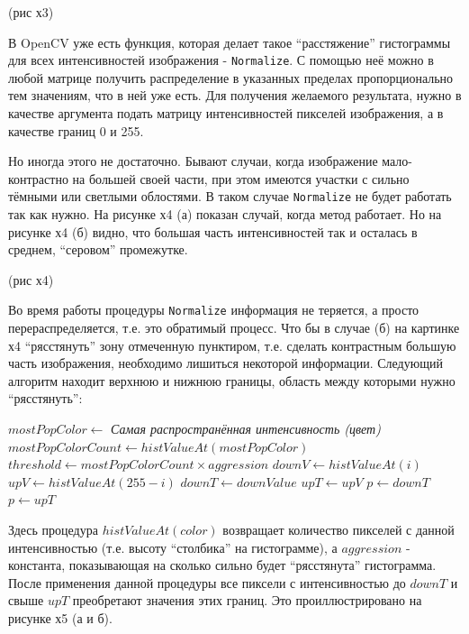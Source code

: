 \documentclass[12pt]{report}
\begin{document}
(рис х3)

В OpenCV уже есть функция, которая делает такое ``расстяжение'' гистограммы для всех интенсивностей изображения - \texttt{Normalize}. С помощью неё можно в любой матрице получить распределение в указанных пределах пропорционально тем значениям, что в ней уже есть. Для получения желаемого результата, нужно в качестве аргумента подать матрицу интенсивностей пикселей изображения, а в качестве границ 0 и 255.

Но иногда этого не достаточно. Бывают случаи, когда изображение мало-контрастно на большей своей части, при этом имеются участки с сильно тёмными или светлыми облостями. В таком случае \texttt{Normalize} не будет работать так как нужно. На рисунке х4 (а) показан случай, когда метод работает. Но на рисунке х4 (б) видно, что большая часть интенсивностей так и осталась в среднем, ``серовом'' промежутке.

(рис х4)

Во время работы процедуры \texttt{Normalize} информация не теряется, а просто перераспределяется, т.е. это обратимый процесс. Что бы в случае (б) на картинке х4 ``рясстянуть'' зону отмеченную пунктиром, т.е. сделать контрастным большую часть изображения, необходимо лишиться некоторой информации. Следующий алгоритм находит верхнюю и нижнюю границы, область между которыми нужно ``рясстянуть'':

\begin{algorithmic}[1]
\STATE $mostPopColor\gets $ \emph{Самая распространённая интенсивность (цвет)}
\STATE $mostPopColorCount\gets histValueAt(mostPopColor)$ 
\STATE $threshold\gets mostPopColorCount\times{aggression}$
\STATE $downV\gets histValueAt(i)$
\STATE $upV\gets histValueAt(255-i)$
\STATE $downT\gets downValue$
\ENDIF
{}
\STATE $upT\gets upV$
\ENDIF
\ENDFOR
{} 
\STATE $p\gets downT$
\STATE $p\gets upT$	
\ENDIF
\ENDFOR
\end{algorithmic}

Здесь процедура $histValueAt(color)$ возвращает количество пикселей с данной интенсивностью (т.е. высоту ``столбика'' на гистограмме), а $aggression$ - константа, показывающая на сколько сильно будет ``рясстянута'' гистограмма. После применения данной процедуры все пиксели с интенсивностью до $downT$ и свыше $upT$ преобретают значения этих границ. Это проиллюстрировано на рисунке х5 (а и б).
\end{document}

